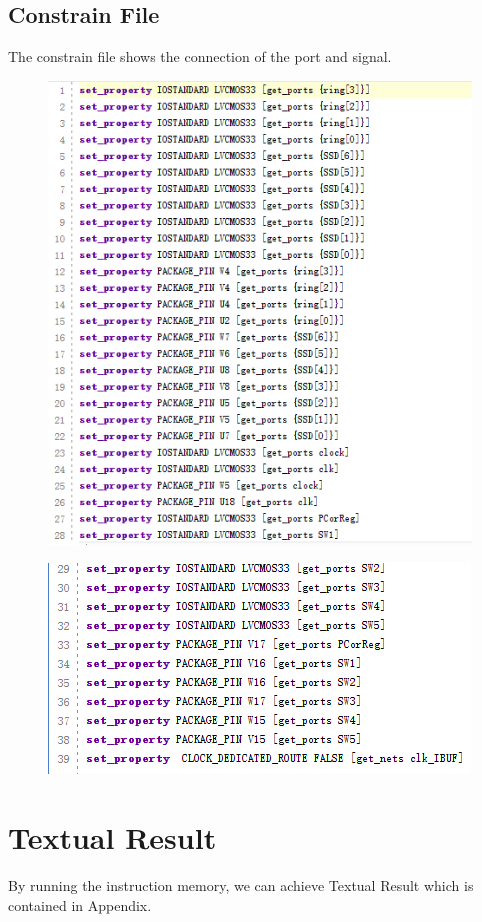 \documentclass[12pt]{article}
\begin{document}
\subsection{Constrain File}
The constrain file shows the connection of the port and signal.
\begin{figure}[H]
\centering
\includegraphics[scale=1]{xdc1.jpg}
\end{figure}
\begin{figure}[H]
\centering
\includegraphics[scale=1]{xdc2.jpg}
\end{figure}
\section{Textual Result}
By running the instruction memory, we can achieve Textual Result which is contained in Appendix. 
\end{document}
